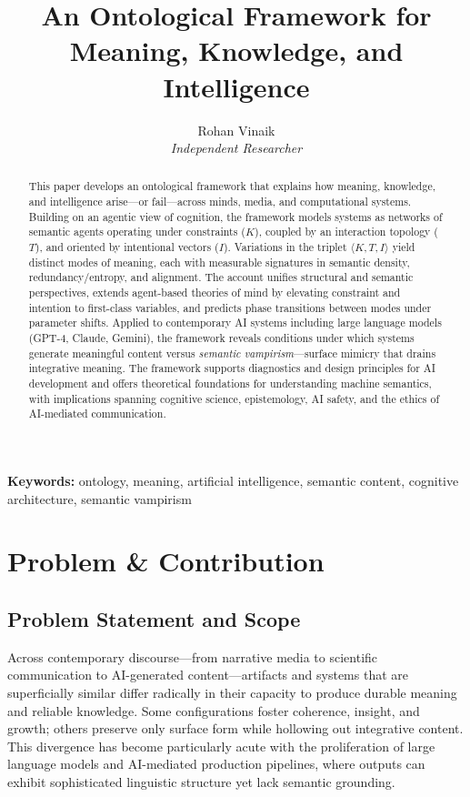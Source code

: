 \documentclass[12pt]{article}
\title{\textbf{An Ontological Framework for Meaning, Knowledge, and Intelligence}}
\author{Rohan Vinaik\\
\textit{Independent Researcher}}
\date{}
\begin{document}
\maketitle

\begin{abstract}
This paper develops an ontological framework that explains how meaning, knowledge, and intelligence arise—or fail—across minds, media, and computational systems. Building on an agentic view of cognition, the framework models systems as networks of semantic agents operating under constraints ($K$), coupled by an interaction topology ($T$), and oriented by intentional vectors ($I$). Variations in the triplet $\langle K, T, I \rangle$ yield distinct modes of meaning, each with measurable signatures in semantic density, redundancy/entropy, and alignment. The account unifies structural and semantic perspectives, extends agent-based theories of mind by elevating constraint and intention to first-class variables, and predicts phase transitions between modes under parameter shifts. Applied to contemporary AI systems including large language models (GPT-4, Claude, Gemini), the framework reveals conditions under which systems generate meaningful content versus \textit{semantic vampirism}—surface mimicry that drains integrative meaning. The framework supports diagnostics and design principles for AI development and offers theoretical foundations for understanding machine semantics, with implications spanning cognitive science, epistemology, AI safety, and the ethics of AI-mediated communication.
\end{abstract}

\noindent\textbf{Keywords:} ontology, meaning, artificial intelligence, semantic content, cognitive architecture, semantic vampirism

\clearpage

\section{Problem \& Contribution}

\subsection{Problem Statement and Scope}

Across contemporary discourse—from narrative media to scientific communication to AI-generated content—artifacts and systems that are superficially similar differ radically in their capacity to produce durable meaning and reliable knowledge. Some configurations foster coherence, insight, and growth; others preserve only surface form while hollowing out integrative content. This divergence has become particularly acute with the proliferation of large language models and AI-mediated production pipelines, where outputs can exhibit sophisticated linguistic structure yet lack semantic grounding.
\end{document}
